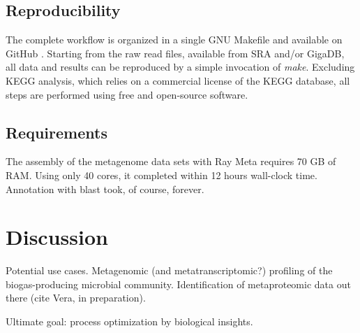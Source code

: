 \documentclass{bmcart}
\begin{document}
\subsection*{Reproducibility}
The complete workflow is organized in a single GNU Makefile and available on GitHub \cite{GitHub}.
Starting from the raw read files, available from SRA and/or GigaDB, all data and results can be reproduced by a simple invocation of \emph{make}.
Excluding KEGG analysis, which relies on a commercial license  of the KEGG database, all steps are performed using free and open-source software.
%
\subsection*{Requirements}
The assembly of the metagenome data sets with Ray Meta requires 70 GB of RAM. Using only 40 cores, it completed within 12 hours wall-clock time.
Annotation with blast took, of course, forever.
%
\section*{Discussion}
Potential use cases.
Metagenomic (and metatranscriptomic?) profiling of the biogas-producing microbial community.
Identification of metaproteomic data out there (cite Vera, in preparation).

Ultimate goal: process optimization by biological insights.

\end{document}
